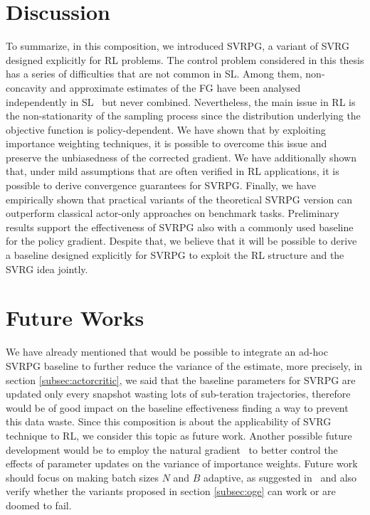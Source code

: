 \section{Discussion}
\vspace{-0.05in}
To summarize, in this composition, we introduced \acs{SVRPG}, a variant of \acs{SVRG} designed explicitly for \acs{RL} problems.
The control problem considered in this thesis has a series of difficulties that are not common in \acs{SL}.
Among them, non-concavity and approximate estimates of the \acs{FG} have been analysed independently in \acs{SL}~\citep[\eg][]{allen2016variance,reddi2016stochastic,harikandeh2015stopwasting} but never combined.
Nevertheless, the main issue in \acs{RL} is the non-stationarity of the sampling process since the distribution underlying the objective function is policy-dependent.
We have shown that by exploiting importance weighting techniques, it is possible to overcome this issue and preserve the unbiasedness of the corrected gradient.
We have additionally shown that, under mild assumptions that are often verified in \acs{RL} applications, it is possible to derive convergence guarantees for \acs{SVRPG}.
Finally, we have empirically shown that practical variants of the theoretical \acs{SVRPG} version can outperform classical actor-only approaches on benchmark tasks.
Preliminary results support the effectiveness of \acs{SVRPG} also with a commonly used baseline for the policy gradient.
Despite that, we believe that it will be possible to derive a baseline designed explicitly for \acs{SVRPG} to exploit the \acs{RL} structure and the \acs{SVRG} idea jointly.
\section{Future Works}
We have already mentioned that would be possible to integrate an ad-hoc \acs{SVRPG} baseline to further reduce the variance of the estimate, more precisely, in section \ref{subsec:actorcritic}, we said that the baseline parameters for \acs{SVRPG} are updated only every snapshot wasting lots of sub-teration trajectories, therefore would be of good impact on the baseline effectiveness finding a way to prevent this data waste. Since this composition is about the applicability of \acs{SVRG} technique to \acs{RL}, we consider this topic as future work.
Another possible future development would be to employ the natural gradient~\citep{kakade2002natural} to better control the effects of parameter updates on the variance of importance weights. Future work should focus on making batch sizes $N$ and $B$ adaptive, as suggested in~\cite{papini2017adaptive} and also verify whether the variants proposed in section \ref{subsec:oge} can work or are doomed to fail.
\vspace{-0.05in}